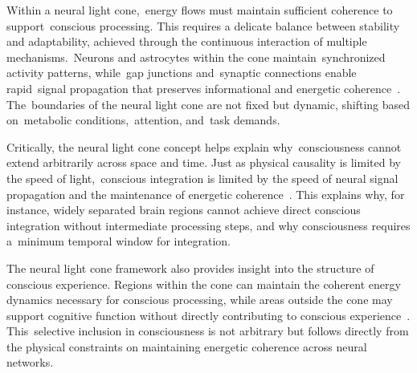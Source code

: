 Within a neural light cone,~energy flows must maintain sufficient coherence to support~conscious processing. This requires a delicate balance between stability and adaptability, achieved through the continuous interaction of multiple mechanisms.~Neurons and astrocytes within the cone maintain~synchronized activity patterns, while~gap junctions and~synaptic connections enable rapid~signal propagation that preserves informational and energetic coherence~\cite{pinotsis2023cytoelectric, pinotsis2023vivo}. The~boundaries of the neural light cone are not fixed but dynamic, shifting based on~metabolic conditions,~attention, and~task demands.

Critically, the neural light cone concept helps explain why~consciousness cannot extend arbitrarily across space and time. Just as physical causality is limited by the speed of light,~conscious integration is limited by the speed of neural signal propagation and the maintenance of energetic coherence~\cite{dehaene2011}. This explains why, for instance, widely separated brain regions cannot achieve direct conscious integration without intermediate processing steps, and why consciousness requires a~minimum temporal window for integration.

The neural light cone framework also provides insight into the structure of conscious experience. Regions within the cone can maintain the coherent energy dynamics necessary for conscious processing, while areas outside the cone may support cognitive function without directly contributing to conscious experience~\cite{baars2013global}. This~selective inclusion in consciousness is not arbitrary but follows directly from the physical constraints on maintaining energetic coherence across neural networks.

